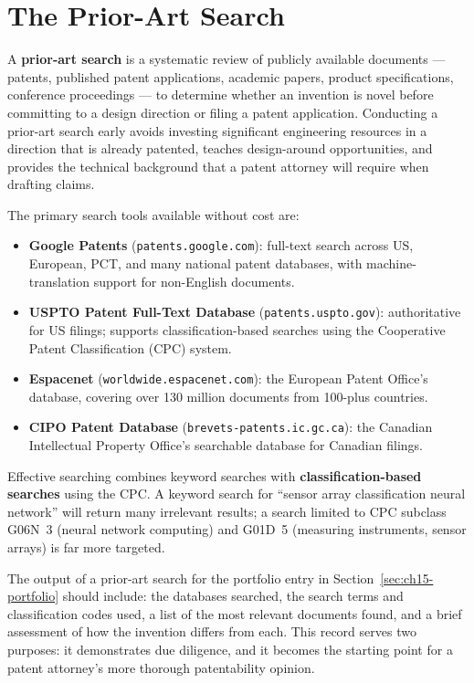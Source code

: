 \section{The Prior-Art Search}
\label{sec:ch15-prior-art}

A \textbf{prior-art search} is a
systematic review of publicly available documents --- patents, published patent
applications, academic papers, product specifications, conference proceedings ---
to determine whether an invention is novel before committing to a design direction
or filing a patent application.
Conducting a prior-art search early avoids investing significant engineering
resources in a direction that is already patented, teaches design-around
opportunities, and provides the technical background that a patent attorney will
require when drafting claims.

The primary search tools available without cost are:
\begin{itemize}
  \item \textbf{Google Patents} (\texttt{patents.google.com}): full-text search
        across US, European, PCT, and many national patent databases, with
        machine-translation support for non-English documents.
  \item \textbf{USPTO Patent Full-Text Database} (\texttt{patents.uspto.gov}):
        authoritative for US filings; supports classification-based searches
        using the Cooperative Patent Classification (CPC) system.
  \item \textbf{Espacenet} (\texttt{worldwide.espacenet.com}): the European
        Patent Office's database, covering over 130 million documents from
        100-plus countries.
  \item \textbf{CIPO Patent Database} (\texttt{brevets-patents.ic.gc.ca}):
        the Canadian Intellectual Property Office's searchable database for
        Canadian filings.
\end{itemize}

Effective searching combines keyword searches with
\textbf{classification-based searches} using the CPC.
A keyword search for ``sensor array classification neural network'' will return
many irrelevant results; a search limited to CPC subclass G06N~3 (neural network
computing) and G01D~5 (measuring instruments, sensor arrays) is far more targeted.

The output of a prior-art search for the portfolio entry in Section~\ref{sec:ch15-portfolio}
should include: the databases searched, the search terms and classification codes
used, a list of the most relevant documents found, and a brief assessment of how
the invention differs from each.
This record serves two purposes: it demonstrates due diligence, and it becomes the
starting point for a patent attorney's more thorough patentability opinion.

